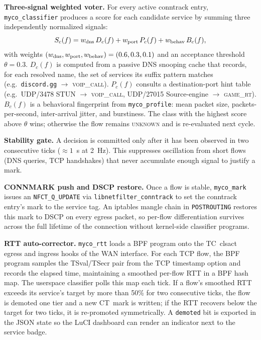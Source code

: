 \documentclass[conference]{IEEEtran}
\begin{document}
\textbf{Three-signal weighted voter.}
For every active conntrack entry, \texttt{myco\_classifier} produces a
score for each candidate service by summing three independently
normalized signals:
\begin{equation}
  S_c(f) = w_{\rm dns}\,D_c(f) + w_{\rm port}\,P_c(f) + w_{\rm behav}\,B_c(f),
  \label{eq:voter}
\end{equation}
with weights $(w_{\rm dns}, w_{\rm port}, w_{\rm behav}) = (0.6, 0.3, 0.1)$
and an acceptance threshold $\theta = 0.3$.
$D_c(f)$ is computed from a passive DNS snooping cache that records,
for each resolved name, the set of services its suffix pattern matches
(e.g.\ \texttt{discord.gg} $\to$ \textsc{voip\_call}).
$P_c(f)$ consults a destination-port hint table (e.g.\ UDP/3478 STUN $\to$
\textsc{voip\_call}, UDP/27015 Source-engine $\to$ \textsc{game\_rt}).
$B_c(f)$ is a behavioral fingerprint from \texttt{myco\_profile}: mean
packet size, packets-per-second, inter-arrival jitter, and burstiness.
The class with the highest score above $\theta$ wins; otherwise the
flow remains \textsc{unknown} and is re-evaluated next cycle.

\textbf{Stability gate.}
A decision is committed only after it has been observed in two
consecutive ticks ($\approx 1$~s at 2~Hz).
This suppresses oscillation from short flows (DNS queries, TCP
handshakes) that never accumulate enough signal to justify a mark.

\textbf{CONNMARK push and DSCP restore.}
Once a flow is stable, \texttt{myco\_mark} issues an
\texttt{NFCT\_Q\_UPDATE} via \texttt{libnetfilter\_conntrack} to set
the conntrack entry's mark to the service tag.
An iptables mangle chain in \texttt{POSTROUTING} restores this mark
to DSCP on every egress packet, so per-flow differentiation survives
across the full lifetime of the connection without kernel-side
classifier programs.

\textbf{RTT auto-corrector.}
\texttt{myco\_rtt} loads a BPF program onto the TC~clsact egress and
ingress hooks of the WAN interface.
For each TCP flow, the BPF program samples the TSval/TSecr pair from
the TCP timestamp option and records the elapsed time, maintaining a
smoothed per-flow RTT in a BPF hash map.
The userspace classifier polls this map each tick.
If a flow's smoothed RTT exceeds its service's target by more than
50\% for two consecutive ticks, the flow is demoted one tier and a
new CT~mark is written; if the RTT recovers below the target for
two ticks, it is re-promoted symmetrically.
A \texttt{demoted} bit is exported in the JSON state so the LuCI
dashboard can render an indicator next to the service badge.
\end{document}
